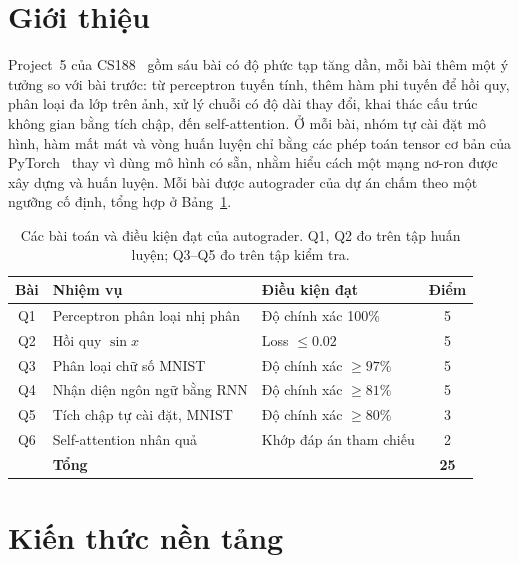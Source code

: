\documentclass[conference]{IEEEtran}
\begin{document}
\section{Giới thiệu}
\label{sec:intro}

Project~5 của CS188~\cite{cs188} gồm sáu bài có độ phức tạp tăng dần,
mỗi bài thêm một ý tưởng so với bài trước: từ perceptron tuyến tính,
thêm hàm phi tuyến để hồi quy, phân loại đa lớp trên ảnh, xử lý chuỗi có độ
dài thay đổi, khai thác cấu trúc không gian bằng tích chập, đến self-attention.
Ở mỗi bài, nhóm tự cài đặt mô hình, hàm mất mát và vòng huấn luyện chỉ bằng các
phép toán tensor cơ bản của PyTorch~\cite{pytorch} thay vì dùng mô hình có sẵn,
nhằm hiểu cách một mạng nơ-ron được xây dựng và huấn luyện. Mỗi bài được
autograder của dự án chấm theo một ngưỡng cố định, tổng hợp ở Bảng~\ref{tab:overview}.

\begin{table}[!ht]
    \centering
    \renewcommand{\arraystretch}{1.15}
    \footnotesize
    \caption{Các bài toán và điều kiện đạt của autograder. Q1, Q2 đo trên tập
    huấn luyện; Q3--Q5 đo trên tập kiểm tra.}
    \label{tab:overview}
    \begin{tabularx}{\columnwidth}{@{}cXlc@{}}
    \toprule
        \textbf{Bài} & \textbf{Nhiệm vụ} & \textbf{Điều kiện đạt} & \textbf{Điểm} \\
    \midrule
        Q1 & Perceptron phân loại nhị phân & Độ chính xác 100\% & 5 \\
        Q2 & Hồi quy $\sin x$ & Loss $\le 0.02$ & 5 \\
        Q3 & Phân loại chữ số MNIST & Độ chính xác $\ge 97\%$ & 5 \\
        Q4 & Nhận diện ngôn ngữ bằng RNN & Độ chính xác $\ge 81\%$ & 5 \\
        Q5 & Tích chập tự cài đặt, MNIST & Độ chính xác $\ge 80\%$ & 3 \\
        Q6 & Self-attention nhân quả & Khớp đáp án tham chiếu & 2 \\
    \midrule
           & \textbf{Tổng} & & \textbf{25} \\
    \bottomrule
    \end{tabularx}
\end{table}

\section{Kiến thức nền tảng}
\label{sec:background}
\end{document}
